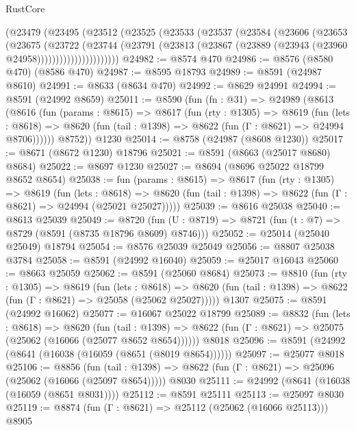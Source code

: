 \begin{lexlean}{RustCore}
\begin{coremodule}
            (@23479
              (@23495
                (@23512
                  (@23525
                    (@23533
                      (@23537
                        (@23584
                          (@23606
                            (@23653
                              (@23675
                                (@23722
                                  (@23744
                                    (@23791
                                      (@23813
                                        (@23867 (@23889 (@23943 (@23960 @24958))))))))))))))))))))))
@24982 := @8574 @470
@24986 := @8576 (@8580 @470) (@8586 @470)
@24987 := @8595 @18793
@24989 := @8591 (@24987 @8610)
@24991 := @8633 (@8634 @470)
@24992 := @8629 @24991
@24994 := @8591 (@24992 @8659)
@25011 := @8590
    (fun (fn : @31) =>
    @24989
      (@8613
        (@8616
          (fun (params : @8615) =>
          @8617
            (fun (rty : @1305) =>
            @8619
              (fun (lets : @8618) =>
              @8620 (fun (tail : @1398) => @8622 (fun (Γ : @8621) => @24994 @8706))))))
        @8752))
    @1230
@25014 := @8758 (@24987 (@8608 @1230))
@25017 := @8671 (@8672 @1230) @18796
@25021 := @8591 (@8663 (@25017 @8680) @8684)
@25022 := @8697 @1230
@25027 := @8694 (@8696 @25022 @18799 @8652 @8654)
@25038 := fun (params : @8615) =>
  @8617
    (fun (rty : @1305) =>
    @8619
      (fun (lets : @8618) =>
      @8620 (fun (tail : @1398) => @8622 (fun (Γ : @8621) => @24994 (@25021 @25027)))))
@25039 := @8616 @25038
@25040 := @8613 @25039
@25049 := @8720
    (fun (U : @8719) => @8721 (fun (t : @7) => @8729 (@8591 (@8735 @18796 @8609) @8746)))
@25052 := @25014 (@25040 @25049) @18794
@25054 := @8576 @25039 @25049
@25056 := @8807 @25038 @3784
@25058 := @8591 (@24992 @16040)
@25059 := @25017 @16043
@25060 := @8663 @25059
@25062 := @8591 (@25060 @8684)
@25073 := @8810
    (fun (rty : @1305) =>
    @8619
      (fun (lets : @8618) =>
      @8620 (fun (tail : @1398) => @8622 (fun (Γ : @8621) => @25058 (@25062 @25027)))))
    @1307
@25075 := @8591 (@24992 @16062)
@25077 := @16067 @25022 @18799
@25089 := @8832
    (fun (lets : @8618) =>
    @8620
      (fun (tail : @1398) =>
      @8622 (fun (Γ : @8621) => @25075 (@25062 (@16066 (@25077 @8652 @8654))))))
    @8018
@25096 := @8591 (@24992 (@8641 (@16038 (@16059 (@8651 (@8019 @8654))))))
@25097 := @25077 @8018
@25106 := @8856
    (fun (tail : @1398) => @8622 (fun (Γ : @8621) => @25096 (@25062 (@16066 (@25097 @8654)))))
    @8030
@25111 := @24992 (@8641 (@16038 (@16059 (@8651 @8031))))
@25112 := @8591 @25111
@25113 := @25097 @8030
@25119 := @8874 (fun (Γ : @8621) => @25112 (@25062 (@16066 @25113))) @8905

\end{coremodule}
\end{lexlean}
